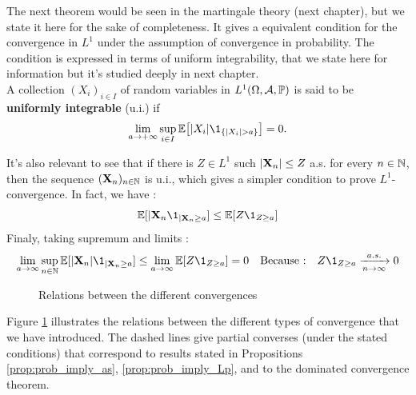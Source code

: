 \documentclass[../Main.tex]{subfiles}
\begin{document}
The next theorem would be seen in the martingale theory (next chapter), but we state it here for the sake of completeness. It gives a equivalent condition for the convergence in $L^1$ under the assumption of convergence in probability. The condition is expressed in terms of uniform integrability, that we state here for information but it's studied deeply in next chapter. \\ 
A collection $(X_i)_{i\in I}$ of random variables in $L^1(\Omega,\mathcal{A},\mathbb{P})$ is said to be \textbf{uniformly integrable} (u.i.) if
\[ \lim_{a\to+\infty} \sup_{i\in I} \EE\big[|X_i|\1_{\{|X_i|>a\}}\big] = 0. \]

It's also relevant to see that if there is $Z\in L^1$ such $|\mathbf{X}_n| \leq Z$ a.s. for every $n\in\mathbb{N}$, then the sequence $(\mathbf{X}_n)_{n \in \mathbb{N}}$ is u.i., which gives a simpler condition to prove $L^1$-convergence. In fact, we have :
\[ \EE[|\bX_n \1_{|\bX_n\geq a}] \leq \EE[Z\1_{Z\geq a}]  \]
Finaly, taking supremum and limits : 
\[ \lim_{\goto{a}} \sup_{n\in\NN} \EE[|\bX_n| \1_{|\bX_n\geq a}] \leq \lim_{\goto{a}} \EE[Z\1_{Z\geq a}] = 0 \quad \text{Because :}\quad Z\1_{Z\geq a} \conv[a.s.]{n} 0\]
 

\begin{figure}[h]
\centering

\caption{Relations between the different convergences} \label{fig:relationshipsConv}
\end{figure}


Figure \ref{fig:relationshipsConv} illustrates the relations between the different types of convergence that we have introduced. The dashed lines give partial converses (under the stated conditions) that correspond to results stated in Propositions \ref{prop:prob_imply_as}, \ref{prop:prob_imply_Lp}, and to the dominated convergence theorem.
\end{document}
